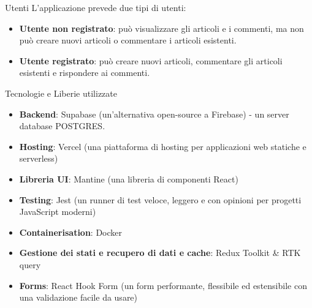 \documentclass[8pt]{beamer}
\begin{document}
\begin{frame}{Utenti}
    L'applicazione prevede due tipi di utenti:
    \begin{itemize}
        \item \textbf{Utente non registrato}: può visualizzare gli articoli e i commenti, ma non può creare nuovi articoli o commentare i articoli esistenti.
        \item \textbf{Utente registrato}: può creare nuovi articoli, commentare gli articoli esistenti e rispondere ai commenti.
    \end{itemize}
\end{frame}

\begin{frame}{Tecnologie e Liberie utilizzate}
    \begin{itemize}
        \item \textbf{Backend}: Supabase (un'alternativa open-source a Firebase) - un server database POSTGRES.
        \item \textbf{Hosting}: Vercel (una piattaforma di hosting per applicazioni web statiche e serverless)
        \item \textbf{Libreria UI}: Mantine (una libreria di componenti React)
        \item \textbf{Testing}: Jest (un runner di test veloce, leggero e con opinioni per progetti JavaScript moderni)
        \item \textbf{Containerisation}: Docker
        \item \textbf{Gestione dei stati e recupero di dati e cache}: Redux Toolkit \& RTK query
        \item \textbf{Forms}: React Hook Form (un form performante, flessibile ed estensibile con una validazione facile da usare)
    \end{itemize}
\end{frame}
\end{document}
